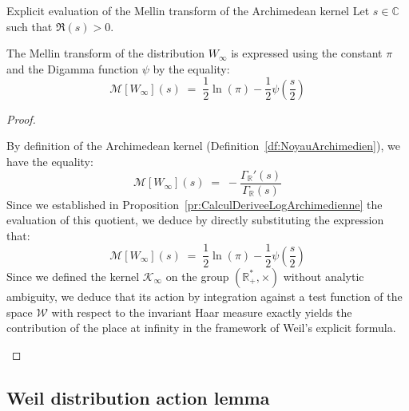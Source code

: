 \documentclass[Riemann_Hypothesis.tex]{subfiles}
\begin{document}
\begin{corollaireEn}[label=cr:EvaluationMellinNoyauArchimedien]{Explicit evaluation of the Mellin transform of the Archimedean kernel}
    Let $s \in \mathbb{C}$ such that $\Re(s) > 0$. \par
    The Mellin transform of the distribution $W_{\infty}$ is expressed using the constant $\pi$ and the Digamma function $\psi$ by the equality:
    \begin{equation*}
        \mathcal{M}[W_{\infty}](s) \;=\; \frac{1}{2}\ln(\pi) - \frac{1}{2}\psi\left(\frac{s}{2}\right)
    \end{equation*}
\end{corollaireEn}

\begin{proof}
    \begin{part_proof}
        By definition of the Archimedean kernel (Definition~\ref{df:NoyauArchimedien}), we have the equality:
        \begin{equation*}
            \mathcal{M}[W_{\infty}](s) \;=\; -\frac{\Gamma_{\mathbb{R}}'(s)}{\Gamma_{\mathbb{R}}(s)}
        \end{equation*}
        Since we established in Proposition~\ref{pr:CalculDeriveeLogArchimedienne} the evaluation of this quotient, we deduce by directly substituting the expression that:
        \begin{equation*}
            \mathcal{M}[W_{\infty}](s) \;=\; \frac{1}{2}\ln(\pi) - \frac{1}{2}\psi\left(\frac{s}{2}\right)
        \end{equation*}
        Since we defined the kernel $\mathcal{K}_{\infty}$ on the group $(\mathbb{R}_+^*, \times)$ without analytic ambiguity, we deduce that its action by integration against a test function of the space $\mathcal{W}$ with respect to the invariant Haar measure exactly yields the contribution of the place at infinity in the framework of Weil's explicit formula.
    \end{part_proof}
\end{proof}


\color{red}
\subsection{Weil distribution action lemma}
\color{black}
\end{document}
